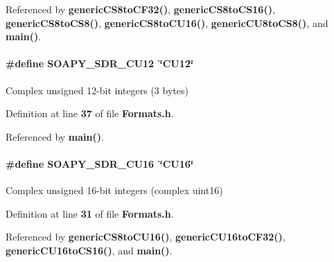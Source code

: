 Referenced by {\bf generic\+C\+S8to\+C\+F32()}, {\bf generic\+C\+S8to\+C\+S16()}, {\bf generic\+C\+S8to\+C\+S8()}, {\bf generic\+C\+S8to\+C\+U16()}, {\bf generic\+C\+U8to\+C\+S8()}, and {\bf main()}.

\paragraph[{S\+O\+A\+P\+Y\+\_\+\+S\+D\+R\+\_\+\+C\+U12}]{\setlength{\rightskip}{0pt plus 5cm}\#define S\+O\+A\+P\+Y\+\_\+\+S\+D\+R\+\_\+\+C\+U12~\char`\"{}C\+U12\char`\"{}}\label{Formats_8h_a0e02ef5516a2dd34db5fe4928858e0ca}


Complex unsigned 12-\/bit integers (3 bytes) 



Definition at line {\bf 37} of file {\bf Formats.\+h}.



Referenced by {\bf main()}.

\paragraph[{S\+O\+A\+P\+Y\+\_\+\+S\+D\+R\+\_\+\+C\+U16}]{\setlength{\rightskip}{0pt plus 5cm}\#define S\+O\+A\+P\+Y\+\_\+\+S\+D\+R\+\_\+\+C\+U16~\char`\"{}C\+U16\char`\"{}}\label{Formats_8h_a67dbeb90d8b3c35d0c7bcf3a7e14d3f4}


Complex unsigned 16-\/bit integers (complex uint16) 



Definition at line {\bf 31} of file {\bf Formats.\+h}.



Referenced by {\bf generic\+C\+S8to\+C\+U16()}, {\bf generic\+C\+U16to\+C\+F32()}, {\bf generic\+C\+U16to\+C\+S16()}, and {\bf main()}.

